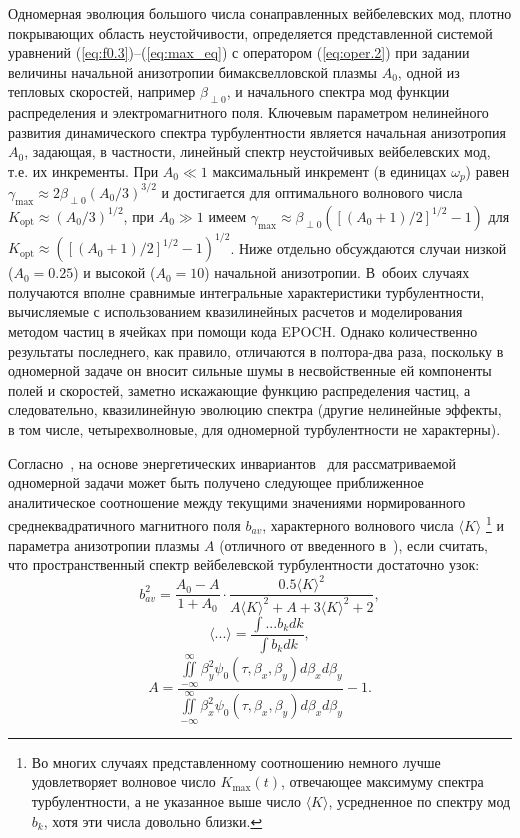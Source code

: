 Одномерная эволюция большого числа сонаправленных вейбелевских мод, плотно покрывающих область неустойчивости, определяется представленной системой уравнений (\ref{eq:f0.3})--(\ref{eq:max_eq}) с оператором (\ref{eq:oper.2}) при задании величины начальной анизотропии бимаксвелловской плазмы $A_0$, одной из тепловых скоростей, например $\beta_{\perp0}$, и начального спектра мод функции распределения и электромагнитного поля. 
Ключевым параметром нелинейного развития динамического спектра турбулентности является начальная анизотропия $A_0$, задающая, в частности, линейный спектр неустойчивых вейбелевских мод, т.е. их инкременты. 
При $A_0\ll1$ максимальный инкремент (в единицах $\omega_p$) равен $\gamma_\mathrm{max}\approx 2 \beta_{\perp0} (A_0 / 3)^{3/2}$ и достигается для оптимального волнового числа $K_\mathrm{opt} \approx (A_0 / 3)^{1/2}$, при $A_0 \gg 1$ имеем $\gamma_\mathrm{max} \approx \beta_{\perp0} \left( \left[ (A_0+1)/2 \right]^{1/2} - 1 \right)$ для $K_\mathrm{opt} \approx \left( \left[ (A_0+1)/2 \right]^{1/2} - 1 \right)^{1/2}$. 
Ниже отдельно обсуждаются случаи низкой ($A_0 = 0.25$) и высокой ($A_0 = 10$) начальной анизотропии. В~обоих случаях получаются вполне сравнимые интегральные характеристики турбулентности, вычисляемые с использованием квазилинейных расчетов и моделирования методом частиц в ячейках при помощи кода EPOCH. Однако количественно результаты последнего, как правило, отличаются в полтора-два раза, поскольку в одномерной задаче он вносит сильные шумы в несвойственные ей компоненты полей и скоростей, заметно искажающие функцию распределения частиц, а следовательно, квазилинейную эволюцию спектра (другие нелинейные эффекты, в том числе, четырехволновые, для одномерной турбулентности не характерны).
 
Согласно~\cite{Nechaev2023}, на основе энергетических инвариантов~\cite{Davidson1972} для рассматриваемой одномерной задачи может быть получено следующее приближенное аналитическое соотношение между текущими значениями нормированного среднеквадратичного магнитного поля $b_{av}$, характерного волнового числа $\langle K\rangle$ \footnote{Во многих случаях представленному соотношению немного лучше удовлетворяет волновое число $K_\mathrm{max}(t)$, отвечающее максимуму спектра турбулентности, а не указанное выше число $\langle K\rangle$, усредненное
по спектру мод $b_{k}$, хотя эти числа довольно близки.} и параметра анизотропии плазмы $A$ (отличного от введенного в~\cite{Nechaev2023}), если считать, что пространственный спектр вейбелевской турбулентности достаточно узок:
\begin{equation}
\label{eq:otsenka}
b_{av}^2 = \frac{A_0-A}{1+A_0} \cdot \dfrac{0.5\langle K\rangle^2}{A \langle K\rangle^2 + A + 3 \langle K\rangle^2 + 2},
\end{equation}
\begin{equation}
\label{eq:angles}
\langle...\rangle=\frac{\int...b_k dk}{\int b_k dk} ,
\end{equation}
\begin{equation}
\label{eq:A_1d}
A=\frac{\iint\limits^{\infty}_{-\infty}\beta_y^2\psi_{0}(\tau,\beta_x,\beta_y) d\beta_x d\beta_y}{\iint\limits^{\infty}_{-\infty}\beta_x^2\psi_{0}(\tau,\beta_x,\beta_y) d\beta_x d\beta_y}-1 .
\end{equation}

